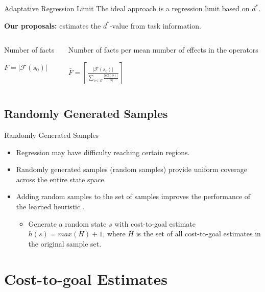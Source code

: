 \documentclass[10pt]{beamer}
\providecommand{\ssdiameter}{\ensuremath{d^*}\xspace}
\providecommand{\facts}{\ensuremath{F}\xspace}
\providecommand{\ceil}[1]{\ensuremath{\left\lceil #1\right\rceil}}
\begin{document}
\begin{frame}{Adaptative Regression Limit}
The ideal approach is a regression limit based on \ssdiameter.
\bigskip

\textbf{Our proposals:} estimates the \ssdiameter-value from task information.

\bigskip

\begin{columns}
    \begin{column}{0.4\textwidth}
        \centering Number of facts

        \bigskip \centering \large $\facts=|\mathcal{F}(s_0)|$
    \end{column}
    \begin{column}{0.6\textwidth}
        \centering Number of facts per mean number of effects in the operators

        \bigskip \centering \large $\bar F=\ceil{\frac{|\mathcal{F}(s_0)|}{\sum_{o\in \mathcal{O}} \frac{|\text{eff}(o)|}{|\mathcal{O}|}}}$
    \end{column}
\end{columns}
\end{frame}

\subsection{Randomly Generated Samples}

\begin{frame}{Randomly Generated Samples}

\begin{itemize}
    \item Regression may have difficulty reaching certain regions.
    \item Randomly generated samples (\alert{random samples}) provide uniform coverage across the entire state space.
    \bigskip
    \item Adding random samples to the set of samples improves the performance of the learned heuristic \citep{otoole2022sampling}.
    \begin{itemize}
        \item Generate a random state $s$ with cost-to-goal estimate $h(s) = max(H)+1$, where $H$ is the set of all cost-to-goal estimates in the original sample set.
    \end{itemize}
\end{itemize}
\end{frame}

\section{Cost-to-goal Estimates}
\end{document}
